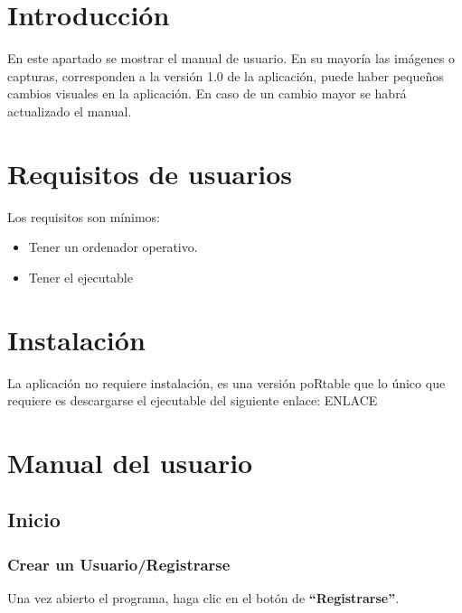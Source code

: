 
\section{Introducción}
En este apartado se mostrar el manual de usuario. En su mayoría las imágenes o capturas, corresponden a la versión 1.0 de la aplicación, puede haber pequeños cambios visuales en la aplicación. En caso de un cambio mayor se habrá actualizado el manual.
\section{Requisitos de usuarios}
Los requisitos son mínimos:
\begin{itemize}
\item Tener un ordenador operativo.
\item Tener el ejecutable
\end{itemize}
\section{Instalación}
La aplicación no requiere instalación, es una versión poRtable que lo único que requiere es descargarse el ejecutable del siguiente enlace: ENLACE
\section{Manual del usuario}
\subsection{Inicio}
\subsubsection{Crear un Usuario/Registrarse}
Una vez abierto el programa, haga clic en el botón de \textbf{“Registrarse”}. 

